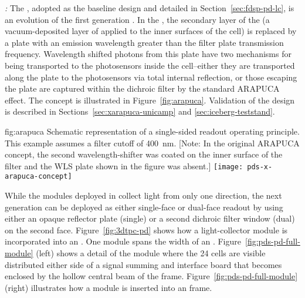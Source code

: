 \textit{:} The , adopted as the baseline design and detailed in 
Section~\ref{sec:fdsp-pd-lc}, is an evolution of the first generation .  In the , the secondary  layer of the  (a vacuum-deposited layer of  applied to the inner surfaces of the cell) is replaced by a  plate with an emission wavelength greater than the filter plate transmission frequency.  Wavelength shifted photons from this plate have two mechanisms for being transported to the photosensors inside the cell--either they are transported along the  plate to the photosensors via total internal reflection, or those escaping the plate are captured within the dichroic filter by the standard ARAPUCA effect.
The concept is illustrated in Figure~\ref{fig:arapuca}.
Validation of the  design is described in Sections~\ref{sec:xarapuca-unicamp} and \ref{sec:iceberg-teststand}.

\begin{dunefigure}{fig:arapuca}
{Schematic representation of a single-sided readout   operating principle.  This example assumes a filter cutoff of \SI{400}{nm}. [Note: In the original ARAPUCA concept, the second wavelength-shifter was coated on the inner surface of the filter and the WLS plate shown in the figure was absent.]}               
\texttt{[image: pds-x-arapuca-concept]}   
\end{dunefigure}

While the  modules deployed in  collect light from only one direction, the next generation  can be deployed as either single-face or dual-face readout by using either an opaque reflector plate (single) or a second dichroic filter window (dual) on the second face. 
Figure~\ref{fig:3dtpc-pd} shows how a light-collector module is incorporated into an . One module spans the width of an . Figure~\ref{fig:pds-pd-full-module} (left) shows a detail of the module where the 24  cells are visible distributed either side of a signal summing and interface board that becomes enclosed by the hollow central beam of the  frame. Figure~\ref{fig:pds-pd-full-module} (right) illustrates how a module is inserted into an  frame.

